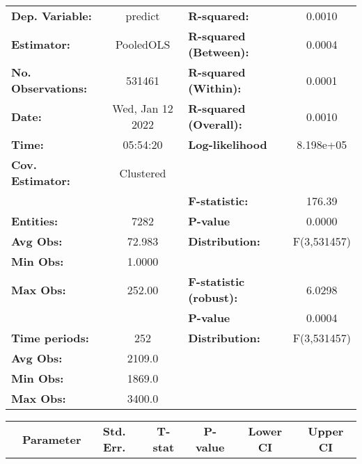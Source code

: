 \begin{center}
\begin{tabular}{lclc}
\toprule
\textbf{Dep. Variable:}    &      predict       & \textbf{  R-squared:         }   &      0.0010      \\
\textbf{Estimator:}        &     PooledOLS      & \textbf{  R-squared (Between):}  &      0.0004      \\
\textbf{No. Observations:} &       531461       & \textbf{  R-squared (Within):}   &      0.0001      \\
\textbf{Date:}             &  Wed, Jan 12 2022  & \textbf{  R-squared (Overall):}  &      0.0010      \\
\textbf{Time:}             &      05:54:20      & \textbf{  Log-likelihood     }   &    8.198e+05     \\
\textbf{Cov. Estimator:}   &     Clustered      & \textbf{                     }   &                  \\
\textbf{}                  &                    & \textbf{  F-statistic:       }   &      176.39      \\
\textbf{Entities:}         &        7282        & \textbf{  P-value            }   &      0.0000      \\
\textbf{Avg Obs:}          &       72.983       & \textbf{  Distribution:      }   &   F(3,531457)    \\
\textbf{Min Obs:}          &       1.0000       & \textbf{                     }   &                  \\
\textbf{Max Obs:}          &       252.00       & \textbf{  F-statistic (robust):} &      6.0298      \\
\textbf{}                  &                    & \textbf{  P-value            }   &      0.0004      \\
\textbf{Time periods:}     &        252         & \textbf{  Distribution:      }   &   F(3,531457)    \\
\textbf{Avg Obs:}          &       2109.0       & \textbf{                     }   &                  \\
\textbf{Min Obs:}          &       1869.0       & \textbf{                     }   &                  \\
\textbf{Max Obs:}          &       3400.0       & \textbf{                     }   &                  \\
\bottomrule
\end{tabular}
\begin{tabular}{lcccccc}
                & \textbf{Parameter} & \textbf{Std. Err.} & \textbf{T-stat} & \textbf{P-value} & \textbf{Lower CI} & \textbf{Upper CI}  \\

\end{tabular}
\end{center}
